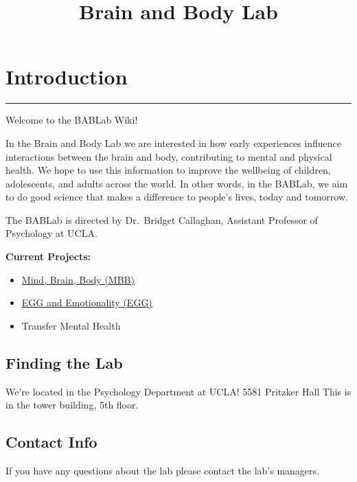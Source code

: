 \documentclass[]{book}
\title{Brain and Body Lab}
\author{}
\date{}
\providecommand{\tightlist}{%
  \setlength{\itemsep}{0pt}\setlength{\parskip}{0pt}}
\begin{document}
\maketitle

{
\setcounter{tocdepth}{1}
\tableofcontents
}
\hypertarget{introduction}{%
\chapter{Introduction}\label{introduction}}

\begin{center}\rule{0.5\linewidth}{\linethickness}\end{center}

Welcome to the BABLab Wiki!

In the Brain and Body Lab we are interested in how early experiences influence interactions between the brain and body, contributing to mental and physical health. We hope to use this information to improve the wellbeing of children, adolescents, and adults across the world. In other words, in the BABLab, we aim to do good science that makes a difference to people's lives, today and tomorrow.

The BABLab is directed by Dr.~Bridget Callaghan, Assistant Professor of Psychology at UCLA.

\textbf{Current Projects:}

\begin{itemize}
\tightlist
\item
  \href{https://bab-lab.github.io/mind_brain_body/}{Mind, Brain, Body (MBB)}
\item
  \href{https://osf.io/nf2bv/}{EGG and Emotionality (EGG)}
\item
  Transfer Mental Health
\end{itemize}

\hypertarget{finding-the-lab}{%
\section{Finding the Lab}\label{finding-the-lab}}

We're located in the Psychology Department at UCLA!
5581 Pritzker Hall
This is in the tower building, 5th floor.

\hypertarget{contact-info}{%
\section{Contact Info}\label{contact-info}}

If you have any questions about the lab please contact the lab's managers.
\end{document}
